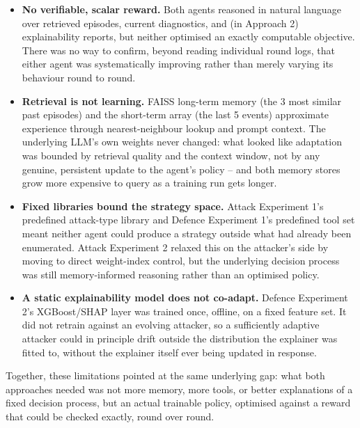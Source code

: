 \begin{itemize}
    \item \textbf{No verifiable, scalar reward.} Both agents reasoned in natural language over retrieved episodes, current diagnostics, and (in Approach 2) explainability reports, but neither optimised an exactly computable objective. There was no way to confirm, beyond reading individual round logs, that either agent was systematically improving rather than merely varying its behaviour round to round.
    \item \textbf{Retrieval is not learning.} FAISS long-term memory (the 3 most similar past episodes) and the short-term array (the last 5 events) approximate experience through nearest-neighbour lookup and prompt context. The underlying LLM's own weights never changed: what looked like adaptation was bounded by retrieval quality and the context window, not by any genuine, persistent update to the agent's policy -- and both memory stores grow more expensive to query as a training run gets longer.
    \item \textbf{Fixed libraries bound the strategy space.} Attack Experiment 1's predefined attack-type library and Defence Experiment 1's predefined tool set meant neither agent could produce a strategy outside what had already been enumerated. Attack Experiment 2 relaxed this on the attacker's side by moving to direct weight-index control, but the underlying decision process was still memory-informed reasoning rather than an optimised policy.
    \item \textbf{A static explainability model does not co-adapt.} Defence Experiment 2's XGBoost/SHAP layer was trained once, offline, on a fixed feature set. It did not retrain against an evolving attacker, so a sufficiently adaptive attacker could in principle drift outside the distribution the explainer was fitted to, without the explainer itself ever being updated in response.
\end{itemize}

Together, these limitations pointed at the same underlying gap: what both approaches needed was not more memory, more tools, or better explanations of a fixed decision process, but an actual trainable policy, optimised against a reward that could be checked exactly, round over round.

